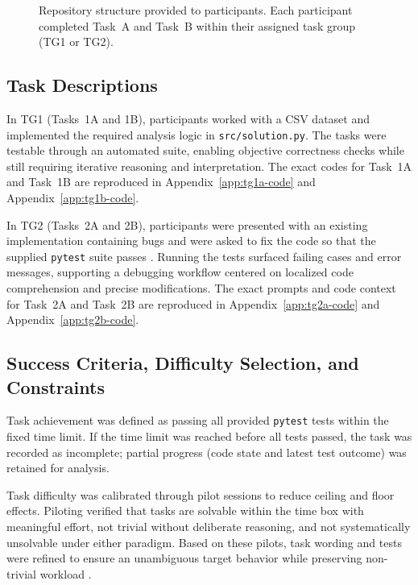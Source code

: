\begin{figure}[H]
  \caption[Repository Structure for TG1 \& TG2]{Repository structure provided to participants. Each participant completed Task~A and Task~B within their assigned task group (TG1 or TG2).}
  \label{fig:repo-structures}
\end{figure}

\subsection{Task Descriptions}
\label{sec:task-desc}

In TG1 (Tasks~1A and 1B), participants worked with a CSV dataset and implemented the required analysis logic in \texttt{src/solution.py}. The tasks were testable through an automated suite, enabling objective correctness checks while still requiring iterative reasoning and interpretation. The exact codes for Task~1A and Task~1B are reproduced in Appendix~\ref{app:tg1a-code} and Appendix~\ref{app:tg1b-code}.

In TG2 (Tasks~2A and 2B), participants were presented with an existing implementation containing bugs and were asked to fix the code so that the supplied \texttt{pytest} suite passes \parencite{pytestDocs}. Running the tests surfaced failing cases and error messages, supporting a debugging workflow centered on localized code comprehension and precise modifications. The exact prompts and code context for Task~2A and Task~2B are reproduced in Appendix~\ref{app:tg2a-code} and Appendix~\ref{app:tg2b-code}.

\subsection{Success Criteria, Difficulty Selection, and Constraints}
\label{sub:success-criteria}
Task achievement was defined as passing all provided \texttt{pytest} tests within the fixed time limit. If the time limit was reached before all tests passed, the task was recorded as incomplete; partial progress (code state and latest test outcome) was retained for analysis.

Task difficulty was calibrated through pilot sessions to reduce ceiling and floor effects. Piloting verified that tasks are solvable within the time box with meaningful effort, not trivial without deliberate reasoning, and not systematically unsolvable under either paradigm. Based on these pilots, task wording and tests were refined to ensure an unambiguous target behavior while preserving non-trivial workload \parencite{wohlin2012experimentation}.

